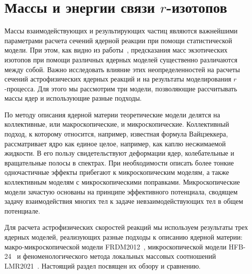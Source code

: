 \section{Массы и энергии связи $r$-изотопов} \label{sec:massmodels}
Массы взаимодействующих и результирующих частиц являются важнейшими параметрами расчета сечений ядерной реакции при помощи статистической модели. 
При этом, как видно из работы~\cite{sobiczewski2018}, предсказания масс экзотических изотопов при помощи различных ядерных моделей существенно различаются между собой. Важно исследовать влияние этих неопределенностей на расчеты сечений астрофизических ядерных реакций и на результаты моделирования $r$-процесса. Для этого мы рассмотрим три модели, позволяющие рассчитывать массы ядер и использующие разные подходы.

По методу описания ядерной материи теоретические модели делятся на коллективные, или макроскопические, и микроскопические. Коллективный подход, к которому относится, например, известная формула Вайцзеккера, рассматривает ядро как единое целое, например, как каплю несжимаемой жидкости. В его пользу свидетельствуют деформации ядер, колебательные и вращательные полосы в спектрах. При необходимости описать более тонкие одночастичные эффекты прибегают к микроскопическим моделям, а также коллективным моделям с микроскопическими поправками. Микроскопические модели зачастую основаны на принципе эффективного потенциала, сводящем задачу взаимодействия многих тел к задаче невзаимодействующих тел в общем потенциале.

Для расчета астрофизических скоростей реакций мы используем результаты трех ядерных моделей, реализующих разные подходы к описанию ядерной материи: макро-микроскопической модели FRDM2012~\cite{moller2016}, микроскопической модели HFB-24~\cite{goriely2013} и феноменологического метода локальных массовых соотношений LMR2021~\cite{vladimirova2022}. Настоящий раздел посвящен их обзору и сравнению.






